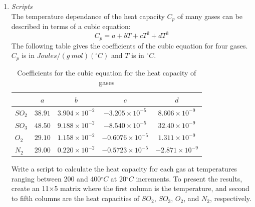 \begin{enumerate}
\item \textit{Scripts}\\
The temperature dependance of the heat capacity $C_p$ of many gases can be described in terms of a cubic equation:
\begin{equation*}
C_p=a+bT+cT^2+dT^3
\end{equation*}
The following table gives the coefficients of the cubic equation for four gases. $C_p$ is in $Joules/(g~mol)(^\circ C)$ and $T$ is in $^\circ C$.
\begin{table}[h]
	\caption{Coefficients for the cubic equation for the heat capacity of gases}
	\label{tab:heat-cap}
	\myfloatalign
	\begin{tabular}{lcccc}\toprule
	\spacedlowsmallcaps{Gas} & $a$ & $b$ & $c$ & $d$ \\ \midrule
	$SO_2$ & $38.91$ & $3.904\times 10^{-2}$ & $-3.205\times 10^{-5}$ & $8.606\times 10^{-9}$ \\
	$SO_3$ & $48.50$ & $9.188\times 10^{-2}$ & $-8.540\times 10^{-5}$ & $32.40\times 10^{-9}$ \\
	$O_2$ & $29.10$ & $1.158\times 10^{-2}$ & $-0.6076\times 10^{-5}$ & $1.311\times 10^{-9}$ \\
	$N_2$ & $29.00$ & $0.220\times 10^{-2}$ & $-0.5723\times 10^{-5}$ & $-2.871\times 10^{-9}$ \\
	\bottomrule
	\end{tabular}
\end{table}
Write a script to calculate the heat capacity for each gas at temperatures ranging between 200 and 400$^\circ C$ at 20$^\circ C$ increments. To present the results, create an 11$\times$5 matrix where the first column is the temperature, and second to fifth columns are the heat capacities of $SO_2$, $SO_3$, $O_2$, and $N_2$, respectively.


\end{enumerate}
